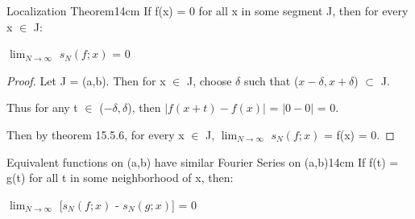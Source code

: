     \vspace{0.5cm}



    \begin{corollary}{Localization Theorem}{14cm}
        If f(x) = 0 for all x in some segment J, then for every x $\in$ J:

        \hspace{0.5cm}
        $\lim_{N \rightarrow \infty}$ $s_N(f;x)$ = 0
    \end{corollary}

    \begin{proof}
        Let J = (a,b). Then for x $\in$ J, choose $\delta$ such that
        ($x-\delta,x+\delta$) $\subset$ J.
        
        Thus for any t $\in$ ($-\delta,\delta$), then
        $|f(x+t) - f(x)|$
        = $|0-0|$ = 0.

        Then by {\color{red} theorem 15.5.6}, for every x $\in$ J,
        $\lim_{N \rightarrow \infty}$ $s_N(f;x)$ = f(x) = 0.
    \end{proof}

    \newpage



    \begin{corollary}
    {Equivalent functions on (a,b) have similar Fourier Series on (a,b)}{14cm}
        If f(t) = g(t) for all t in some neighborhood of x, then:

        \hspace{0.5cm}
        $\lim_{N \rightarrow \infty}$ [$s_N(f;x)$ - $s_N(g;x)$] = 0
    \end{corollary}

